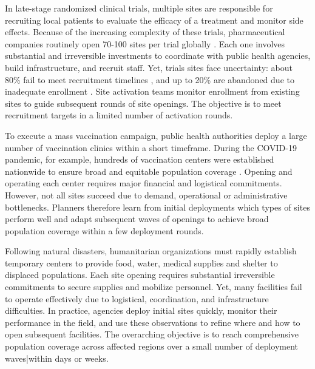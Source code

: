 \documentclass[blindrev]{informs3noheader}
\begin{document}
\begin{example}
In late-stage randomized clinical trials, multiple sites are responsible for recruiting local patients to evaluate the efficacy of a treatment and monitor side effects. Because of the increasing complexity of these trials, pharmaceutical companies routinely open 70-100 sites per trial globally \citep{brogger2022changes}. Each one involves substantial and irreversible investments to coordinate with public health agencies, build infrastructure, and recruit staff. Yet, trials sites face uncertainty: about 80\% fail to meet recruitment timelines \citep{johnson2015evidence}, and up to 20\% are abandoned due to inadequate enrollment \citep{carlisle2015unsuccessful}. Site activation teams monitor enrollment from existing sites to guide subsequent rounds of site openings. The objective is to meet recruitment targets in a limited number of activation rounds.
\end{example}
\begin{example}
To execute a mass vaccination campaign, public health authorities deploy a large number of vaccination clinics within a short timeframe. During the COVID-19 pandemic, for example, hundreds of vaccination centers were established nationwide to ensure broad and equitable population coverage \citep{bertsimas2022locate,jacquillat2024branch}. Opening and operating each center requires major financial and logistical commitments. However, not all sites succeed due to demand, operational or administrative bottlenecks. Planners therefore learn from initial deployments which types of sites perform well and adapt subsequent waves of openings to achieve broad population coverage within a few deployment rounds.
\end{example}
\begin{example}
Following natural disasters, humanitarian organizations must rapidly establish temporary centers to provide food, water, medical supplies and shelter to displaced populations. Each site opening requires substantial irreversible commitments to secure supplies and mobilize personnel. Yet, many facilities fail to operate effectively due to logistical, coordination, and infrastructure difficulties. In practice, agencies deploy initial sites quickly, monitor their performance in the field, and use these observations to refine where and how to open subsequent facilities. The overarching objective is to reach comprehensive population coverage across affected regions over a small number of deployment waves|within days or weeks.
\end{example}
\end{document}
